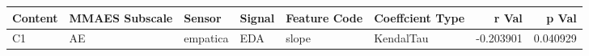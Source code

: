 \begin{tabular}{llllllrr}
\toprule
Content & MMAES Subscale &   Sensor & Signal & Feature Code & Coeffcient Type &     r Val &    p Val \\
\midrule
     C1 &             AE & empatica &    EDA &        slope &       KendalTau & -0.203901 & 0.040929 \\
\bottomrule
\end{tabular}
